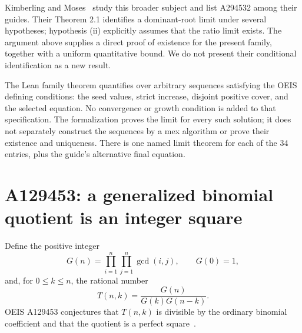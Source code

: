 \documentclass[11pt]{article}
\begin{document}
Kimberling and Moses~\cite{KimberlingMoses} study this broader subject and
list A294532 among their guides. Their Theorem 2.1 identifies a dominant-root
limit under several hypotheses; hypothesis (ii) explicitly assumes that
the ratio limit exists. The argument above supplies a direct proof of
existence for the present family, together with a uniform quantitative
bound. We do not present their conditional identification as a new result.

The Lean family theorem quantifies over arbitrary sequences satisfying the
OEIS defining conditions: the seed values, strict increase, disjoint
positive cover, and the selected equation. No convergence or growth
condition is added to that specification. The formalization proves the
limit for every such solution; it does not separately construct the
sequences by a mex algorithm or prove their existence and uniqueness.
There is one named limit theorem for each of the 34 entries, plus the
guide's alternative final equation.

\newpage
\section{A129453: a generalized binomial quotient is an integer square}

Define the positive integer
\[
 G(n)=\prod_{i=1}^n\prod_{j=1}^n\gcd(i,j),\qquad G(0)=1,
\]
and, for $0\le k\le n$, the rational number
\[
 T(n,k)=\frac{G(n)}{G(k)G(n-k)}.
\]
OEIS A129453 conjectures that $T(n,k)$ is divisible by the ordinary
binomial coefficient and that the quotient is a perfect
square~\cite{A129453}.
\end{document}
